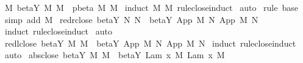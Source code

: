 \begin{isabellebody}
%
\isadelimproof
\isanewline
%
\endisadelimproof
\isanewline
{}\isamarkupfalse%
\ M{}{\isacharcolon}\ {\isachardoublequoteopen}beta{\isacharunderscore}Y{\isacharasterisk}\ M\ M{\isacharprime}\ {\isasymLongrightarrow}\ pbeta{\isacharasterisk}\ M\ M{\isacharprime}{\isachardoublequoteclose}\isanewline
%
\isadelimproof
%
\endisadelimproof
%
\isatagproof
{}\isamarkupfalse%
\ {\isacharparenleft}induct\ M\ M{\isacharprime}\ rule{\isacharcolon}close{\isachardot}induct{\isacharparenright}\isanewline
{}\isamarkupfalse%
\ auto\isanewline
{}\isamarkupfalse%
\ {\isacharparenleft}rule\ base{\isacharparenright}\isanewline
{}\isamarkupfalse%
\ {\isacharparenleft}simp\ add{\isacharcolon}\ M{}{\isacharprime}{\isacharparenright}%
\endisatagproof
{\isafoldproof}%
%
\isadelimproof
\isanewline
%
\endisadelimproof
\isanewline
{}\isamarkupfalse%
\ red{\isacharunderscore}r{\isacharunderscore}close{\isacharcolon}\ {\isachardoublequoteopen}beta{\isacharunderscore}Y{\isacharasterisk}\ N\ N{\isacharprime}\ {\isasymLongrightarrow}\ beta{\isacharunderscore}Y{\isacharasterisk}\ {\isacharparenleft}App\ M\ N{\isacharparenright}\ {\isacharparenleft}App\ M\ N{\isacharprime}{\isacharparenright}{\isachardoublequoteclose}\isanewline
%
\isadelimproof
%
\endisadelimproof
%
\isatagproof
{}\isamarkupfalse%
\ {\isacharparenleft}induct\ rule{\isacharcolon}close{\isachardot}induct{\isacharparenright}\isanewline
{}\isamarkupfalse%
\ auto%
\endisatagproof
{\isafoldproof}%
%
\isadelimproof
\isanewline
%
\endisadelimproof
\isanewline
{}\isamarkupfalse%
\ red{\isacharunderscore}l{\isacharunderscore}close{\isacharcolon}\ {\isachardoublequoteopen}beta{\isacharunderscore}Y{\isacharasterisk}\ M\ M{\isacharprime}\ {\isasymLongrightarrow}\ beta{\isacharunderscore}Y{\isacharasterisk}\ {\isacharparenleft}App\ M\ N{\isacharparenright}\ {\isacharparenleft}App\ M{\isacharprime}\ N{\isacharparenright}{\isachardoublequoteclose}\isanewline
%
\isadelimproof
%
\endisadelimproof
%
\isatagproof
{}\isamarkupfalse%
\ {\isacharparenleft}induct\ rule{\isacharcolon}close{\isachardot}induct{\isacharparenright}\isanewline
{}\isamarkupfalse%
\ auto%
\endisatagproof
{\isafoldproof}%
%
\isadelimproof
\isanewline
%
\endisadelimproof
\isanewline
{}\isamarkupfalse%
\ abs{\isacharunderscore}close{\isacharcolon}\ {\isachardoublequoteopen}beta{\isacharunderscore}Y{\isacharasterisk}\ M\ M{\isacharprime}\ {\isasymLongrightarrow}\ beta{\isacharunderscore}Y{\isacharasterisk}\ {\isacharparenleft}Lam\ {\isacharbrackleft}x{\isacharbrackright}{\isachardot}\ M{\isacharparenright}\ {\isacharparenleft}Lam\ {\isacharbrackleft}x{\isacharbrackright}{\isachardot}\ M{\isacharprime}{\isacharparenright}{\isachardoublequoteclose}\isanewline

\end{isabellebody}
